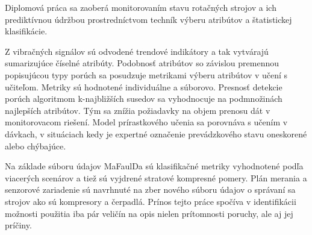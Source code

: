 Diplomová práca sa zaoberá monitorovaním stavu rotačných strojov a ich prediktívnou údržbou prostredníctvom techník výberu atribútov a štatistickej klasifikácie.

Z vibračných signálov sú odvodené trendové indikátory a tak vytvárajú sumarizujúce číselné atribúty. Podobnosť atribútov so závislou premennou popisujúcou typy porúch sa posudzuje metrikami výberu atribútov v učení s učiteľom. Metriky sú hodnotené individuálne a súborovo. Presnosť detekcie porúch algoritmom k-najbližších susedov sa vyhodnocuje na podmnožinách najlepších atribútov. Tým sa znížia požiadavky na objem prenosu dát v monitorovacom riešení. Model prírastkového učenia sa porovnáva s učením v dávkach, v situáciach kedy je expertné označenie prevádzkového stavu oneskorené alebo chýbajúce.

Na základe súboru údajov MaFaulDa sú klasifikačné metriky vyhodnotené podľa viacerých scenárov a tiež sú vyjdrené stratové kompresné pomery. Plán merania a senzorové zariadenie sú navrhnuté na zber nového súboru údajov o správaní sa strojov ako sú kompresory a čerpadlá. Prínos tejto práce spočíva v identifikácii možnosti použitia iba pár veličín na opis nielen prítomnosti poruchy, ale aj jej príčiny.
\emptypage